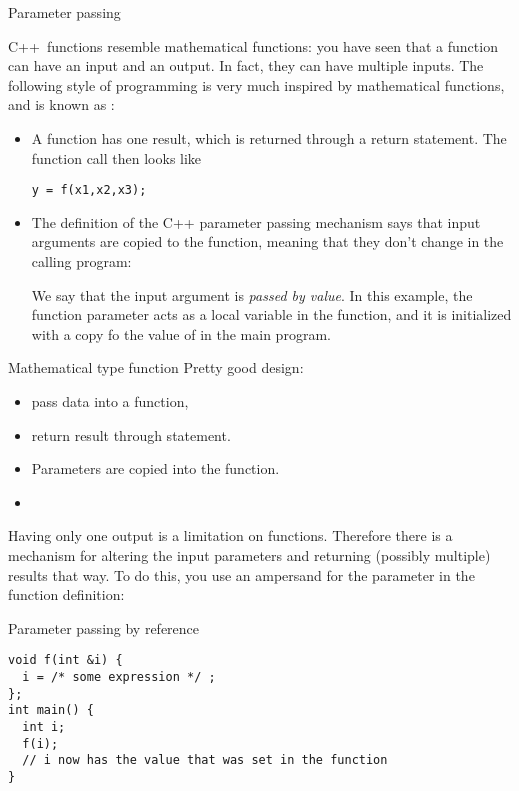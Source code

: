 
 {Parameter passing}
\label{sec:passing}

C++~functions resemble mathematical functions:
you have seen that a function can have an input and an
output. In fact, they can have multiple inputs.
The following style of programming is very much inspired by
mathematical functions, and is known as :
\begin{itemize}
\item A function has one result, which is returned through a return
  statement. The function call then looks like
\begin{verbatim}
y = f(x1,x2,x3);
\end{verbatim}
\item The definition of the C++ parameter passing mechanism says that
  input arguments are copied to the function, meaning that they don't
  change in the calling program:

  We say that the input argument is
  \emph{passed by value}.
  In this example, the function parameter  acts as a local
  variable in the function, and it is initialized with a copy fo the
  value of  in the main program.
\end{itemize}

\begin{slide}{Mathematical type function}
  \label{sl:func-functional}
  Pretty good design:
  \begin{itemize}
  \item pass data into a function,
  \item return result through  statement.
  \item Parameters are copied into the function.
  \item {}
  \end{itemize}
\end{slide}

Having only one output is a limitation on functions. Therefore there
is a mechanism for altering the input parameters and returning
(possibly multiple) results that way. To do this, you use an ampersand
for the parameter in the function definition:

\begin{block}{Parameter passing by reference}
  \label{sl:pass-by-ref}
\begin{verbatim}
void f(int &i) {
  i = /* some expression */ ;
};
int main() {
  int i;
  f(i);
  // i now has the value that was set in the function
}
\end{verbatim}
\end{block}

